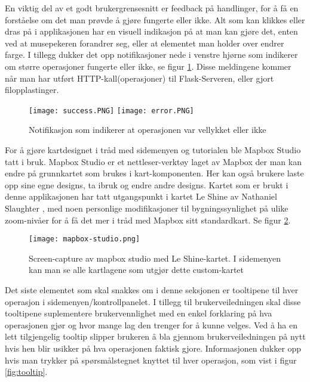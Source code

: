 En viktig del av et godt brukergrensesnitt er feedback på handlinger, for å få en forståelse om det man prøvde å gjøre fungerte eller ikke. Alt som kan klikkes eller dras på i applikasjonen har en visuell indikasjon på at man kan gjøre det, enten ved at musepekeren forandrer seg, eller at elementet man holder over endrer farge. I tillegg dukker det opp notifikasjoner nede i venstre hjørne som indikerer om større operasjoner fungerte eller ikke, se figur \ref{fig:success}. Disse meldingene kommer når man har utført HTTP-kall(operasjoner) til Flask-Serveren, eller gjort filopplastinger.  

\begin{figure}[h]
    \center
    \texttt{[image: success.PNG]}
    \texttt{[image: error.PNG]}
    \caption{Notifikasjon som indikerer at operasjonen var vellykket eller ikke}
    \label{fig:success}
\end{figure}

For å gjøre kartdesignet i tråd med sidemenyen og tutorialen ble Mapbox Studio tatt i bruk. Mapbox Studio er et nettleser-verktøy laget av Mapbox der man kan endre på grunnkartet som brukes i kart-komponenten. Her kan også brukere laste opp sine egne designs, ta ibruk og endre andre designs. Kartet som er brukt i denne applikasjonen har tatt utgangspunkt i kartet Le Shine av Nathaniel Slaughter \cite{Slaughter}, med noen personlige modifikasjoner til bygningssynlighet på ulike zoom-nivåer for å få det mer i tråd med Mapbox sitt standardkart. Se figur \ref{fig:mapbox-studio}.

\begin{figure}[h]
    \center
    \texttt{[image: mapbox-studio.png]}
    \caption{Screen-capture av mapbox studio med Le Shine-kartet. I sidemenyen kan man se alle kartlagene som utgjør dette custom-kartet}
    \label{fig:mapbox-studio}
\end{figure}

Det siste elementet som skal snakkes om i denne seksjonen er tooltipene til hver operasjon i sidemenyen/kontrollpanelet. I tillegg til brukerveiledningen skal disse tooltipene suplementere brukervennlighet med en enkel forklaring på hva operasjonen gjør og hvor mange lag den trenger for å kunne velges. Ved å ha en lett tilgjengelig tooltip slipper brukeren å bla gjennom brukerveiledningen på nytt hvis hen blir usikker på hva operasjonen faktisk gjore. Informasjonen dukker opp hvis man trykker på spørsmålstegnet knyttet til hver operasjon, som vist i figur \ref{fig:tooltip}. 


